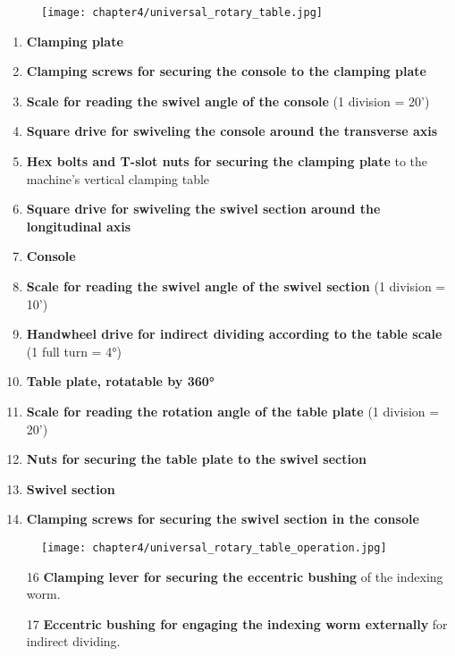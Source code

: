 \begin{figure}[h]
    \centering
    \texttt{[image: chapter4/universal\_rotary\_table.jpg]}
\end{figure}

\begin{enumerate}
    \item \textbf{Clamping plate}
    \item \textbf{Clamping screws for securing the console to the clamping plate}
    \item \textbf{Scale for reading the swivel angle of the console} (1 division = 20')
    \item \textbf{Square drive for swiveling the console around the transverse axis}
    \item \textbf{Hex bolts and T-slot nuts for securing the clamping plate} to the machine's vertical clamping table
    \item \textbf{Square drive for swiveling the swivel section around the longitudinal axis}
    \item \textbf{Console}
    \item \textbf{Scale for reading the swivel angle of the swivel section} (1 division = 10')
    \item \textbf{Handwheel drive for indirect dividing according to the table scale} (1 full turn = 4°)
    \item \textbf{Table plate, rotatable by 360°}
    \item \textbf{Scale for reading the rotation angle of the table plate} (1 division = 20')
    \item \textbf{Nuts for securing the table plate to the swivel section}
    \item \textbf{Swivel section}
    \item \textbf{Clamping screws for securing the swivel section in the console}
\end{enumerate}


\begin{figure}[h]
    \centering
    \texttt{[image: chapter4/universal\_rotary\_table\_operation.jpg]}
\end{figure}

\begin{enumerate}
    \item[16] \textbf{Clamping lever for securing the eccentric bushing} of the indexing worm.
    \item[17] \textbf{Eccentric bushing for engaging the indexing worm externally} for indirect dividing.
\end{enumerate}

